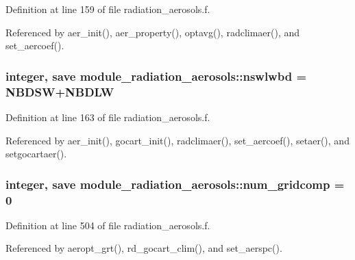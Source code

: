 Definition at line 159 of file radiation\+\_\+aerosols.\+f.



Referenced by aer\+\_\+init(), aer\+\_\+property(), optavg(), radclimaer(), and set\+\_\+aercoef().

\subsubsection[{\texorpdfstring{nswlwbd}{nswlwbd}}]{\setlength{\rightskip}{0pt plus 5cm}integer, save module\+\_\+radiation\+\_\+aerosols\+::nswlwbd = N\+B\+D\+SW+N\+B\+D\+LW\hspace{0.3cm}{\ttfamily [private]}}\hypertarget{namespacemodule__radiation__aerosols_ab77b3b4aa76361277d828c7ba5dc3eda}{}\label{namespacemodule__radiation__aerosols_ab77b3b4aa76361277d828c7ba5dc3eda}


Definition at line 163 of file radiation\+\_\+aerosols.\+f.



Referenced by aer\+\_\+init(), gocart\+\_\+init(), radclimaer(), set\+\_\+aercoef(), setaer(), and setgocartaer().

\subsubsection[{\texorpdfstring{num\+\_\+gridcomp}{num_gridcomp}}]{\setlength{\rightskip}{0pt plus 5cm}integer, save module\+\_\+radiation\+\_\+aerosols\+::num\+\_\+gridcomp = 0\hspace{0.3cm}{\ttfamily [private]}}\hypertarget{namespacemodule__radiation__aerosols_a6ddeb7b34ad2d6ab1575be3520e85891}{}\label{namespacemodule__radiation__aerosols_a6ddeb7b34ad2d6ab1575be3520e85891}


Definition at line 504 of file radiation\+\_\+aerosols.\+f.



Referenced by aeropt\+\_\+grt(), rd\+\_\+gocart\+\_\+clim(), and set\+\_\+aerspc().

